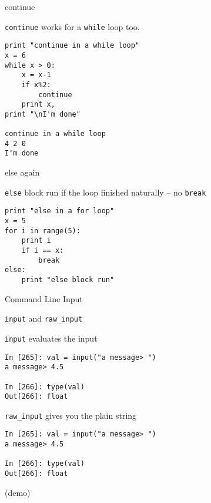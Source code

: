 \documentclass{beamer}
\begin{document}
\begin{frame}[fragile]{continue}

{\Large \verb|continue| works for a \verb|while| loop too.}

\begin{verbatim}
print "continue in a while loop"
x = 6
while x > 0:
    x = x-1
    if x%2:
        continue
    print x,
print "\nI'm done"

continue in a while loop
4 2 0 
I'm done
\end{verbatim}
\end{frame}

\begin{frame}[fragile]{else again}

{\Large \verb|else| block run if the loop finished naturally -- no \verb|break|}

\begin{verbatim}
print "else in a for loop"
x = 5
for i in range(5):
    print i
    if i == x:
        break
else:
    print "else block run"

\end{verbatim}
\end{frame}

\begin{frame}[fragile]{Command Line Input}

{\Large \verb|input| and \verb|raw_input|}

{\Large \verb|input| evaluates the input}
\begin{verbatim}
In [265]: val = input("a message> ")
a message> 4.5

In [266]: type(val)
Out[266]: float
\end{verbatim}

{\Large \verb|raw_input| gives you the plain string}
\begin{verbatim}
In [265]: val = input("a message> ")
a message> 4.5

In [266]: type(val)
Out[266]: float
\end{verbatim}
(demo)
\end{frame}
\end{document}
